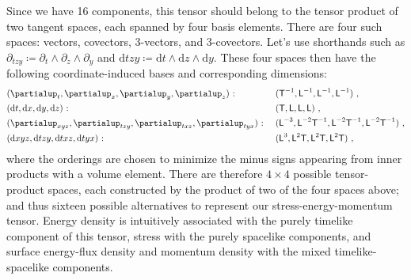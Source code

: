 \documentclass[\ifafour a4paper,12pt,\else a5paper,10pt,\fi%
onecolumn,oneside,article,%
british%
]{memoir}
\theoremstyle{remark}
\theoremstyle{innote}
\newcommand*{\de}{\partialup}%
\newcommand*{\di}{\mathrm{d}}%
\newcommand*{\defd}{\coloneqq}
\renewcommand*{\|}[1][]{\nonscript\,#1\vert\nonscript\;\mathopen{}}
\newcommand*{\Le}{\textsf{L}}
\newcommand*{\Ti}{\textsf{T}}
\newcommand*{\dexyz}{\de_{xyz}}
\newcommand*{\detzy}{\de_{tzy}}
\newcommand*{\detxz}{\de_{txz}}
\newcommand*{\detyx}{\de_{tyx}}
\newcommand*{\dixyz}{\di xyz}
\newcommand*{\ditzy}{\di tzy}
\newcommand*{\ditxz}{\di txz}
\newcommand*{\dityx}{\di tyx}
\begin{document}
Since we have 16 components, this tensor should belong to the tensor
product of two tangent spaces, each spanned by four basis elements. There
are four such spaces: vectors, covectors, 3-vectors, and 3-covectors. Let's
use shorthands such as
$\detzy \defd \de_{t} \land \de_{z} \land \de_{y}$ and
$\ditzy \defd \di t \land \di z \land \di y$. These four spaces then have
the following coordinate-induced bases and corresponding dimensions:
\begin{subequations}\label{eq:bases}
  \begin{align}
    \label{eq:base_vec}
    &  (\de_{t}, \de_{x}, \de_{y}, \de_{z})\ \text{:}
    &&\text{\small }\ (\Ti^{-1}, \Le^{-1}, \Le^{-1}, \Le^{-1}) \ ,
    \\
    \label{eq:base_covec}
    &  (\di t, \di x, \di y, \di z) \ \text{:}
    &&\text{\small }\ (\Ti, \Le, \Le, \Le) \ ,
    \\
    \label{eq:base_trivec}
    &  (\dexyz, \detzy, \detxz, \detyx)\ \text{:}
    &&\text{\small }\  (\Le^{-3}, \Le^{-2}\Ti^{-1}, \Le^{-2}\Ti^{-1}, \Le^{-2}\Ti^{-1}) \ ,
    \\
    \label{eq:base_tricovec}
    &  (\dixyz, \ditzy, \ditxz, \dityx)\ \text{:}
    &&\text{\small }\  (\Le^{3}, \Le^{2}\Ti, \Le^{2}\Ti, \Le^{2}\Ti) \ ,
  \end{align}
\end{subequations}
where the orderings are chosen to minimize the minus signs appearing from
inner products with a volume element. There are therefore $4 \times 4$
possible tensor-product spaces, each constructed by the product of two of
the four spaces above; %
and thus sixteen possible alternatives to represent our stress-energy-momentum
tensor. Energy density is intuitively associated with the purely timelike
component of this tensor, stress with the purely spacelike components, and
surface energy-flux density and momentum density with the mixed
timelike-spacelike components.
\end{document}
